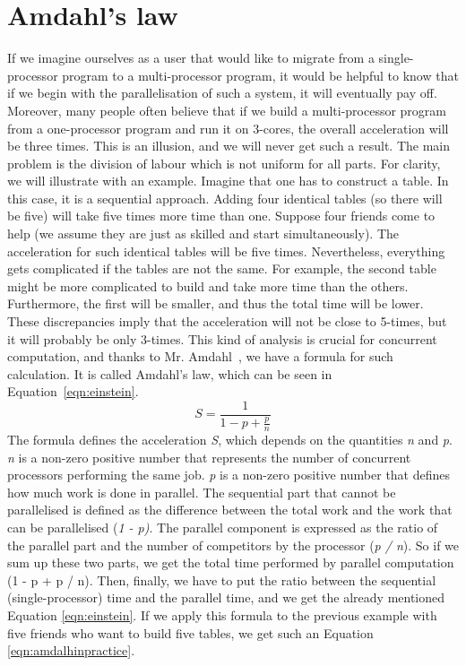 \section{Amdahl's law}
\label{04:amdalhlaw}

If we imagine ourselves as a user that would like to migrate from a single-processor program to a multi-processor program, it would be helpful to know that if we begin with the parallelisation of such a system, it will eventually pay off.
Moreover, many people often believe that if we build a multi-processor program from a one-processor program and run it on 3-cores, the overall acceleration will be three times.
This is an illusion, and we will never get such a result.
The main problem is the division of labour which is not uniform for all parts.
For clarity, we will illustrate with an example.
Imagine that one has to construct a table.
In this case, it is a sequential approach.
Adding four identical tables (so there will be five) will take five times more time than one.
Suppose four friends come to help (we assume they are just as skilled and start simultaneously).
The acceleration for such identical tables will be five times.
Nevertheless, everything gets complicated if the tables are not the same.
For example, the second table might be more complicated to build and take more time than the others.
Furthermore, the first will be smaller, and thus the total time will be lower.
These discrepancies imply that the acceleration will not be close to 5-times, but it will probably be only 3-times.
This kind of analysis is crucial for concurrent computation, and thanks to Mr. Amdahl~\cite{amdalh}, we have a formula for such calculation.
It is called Amdahl's law, which can be seen in Equation~\eqref{eqn:einstein}.
\begin{equation}
    \label{eqn:einstein}
    S = \frac{1}{1 - p + \frac{p}{n}}
    \tag{1}
\end{equation}
The formula defines the acceleration \emph{S}, which depends on the quantities \emph{n} and \emph{p}. \emph{n} is a non-zero positive number that represents the number of concurrent processors performing the same job. \emph{p} is a non-zero positive number that defines how much work is done in parallel.
The sequential part that cannot be parallelised is defined as the difference between the total work and the work that can be parallelised (\emph{1 - p)}. The parallel component is expressed as the ratio of the parallel part and the number of competitors by the processor (\emph{p / n}).
So if we sum up these two parts, we get the total time performed by parallel computation ({1 - p + p / n}). Then, finally, we have to put the ratio between the sequential (single-processor) time and the parallel time, and we get the already mentioned Equation \ref{eqn:einstein}.
If we apply this formula to the previous example with five friends who want to build five tables, we get such an Equation \eqref{eqn:amdalhinpractice}.

